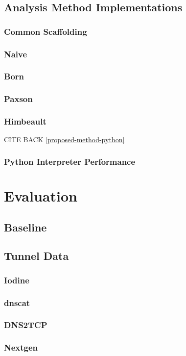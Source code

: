 \documentclass[12pt]{report}
\theoremstyle{remark}
\theoremstyle{definition}
\theoremstyle{definition}
\theoremstyle{definition}
\begin{document}
\section{Analysis Method Implementations}
\subsection{Common Scaffolding}
\subsection{Naive}
\subsection{Born}
\subsection{Paxson}
\subsection{Himbeault}
CITE BACK \ref{proposed-method-python}

\subsection{Python Interpreter Performance}

\chapter{Evaluation}
\section{Baseline}
\section{Tunnel Data}
\subsection{Iodine}
\subsection{dnscat}
\subsection{DNS2TCP}
\subsection{Nextgen}
\end{document}
